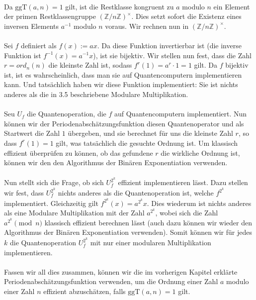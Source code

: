 \paragraph{}
Da $\text{ggT}(a, n) = 1$ gilt, ist die Restklasse kongruent zu $a$ modulo $n$ ein Element der primen Restklassengruppe $(\mathbb {Z}/n\mathbb {Z} )^{\times}$. Dies setzt sofort die Existenz eines inversen Elements $a^{-1}$ modulo $n$ voraus. Wir rechnen nun in $(\mathbb {Z}/n\mathbb {Z})^{\times}$.
\paragraph{}
Sei $f$ definiert als $f(x) := ax$. Da diese Funktion invertierbar ist (die inverse Funktion ist $f^{-1}(x) = a^{-1}x$), ist sie bijektiv. Wir stellen nun fest, dass die Zahl $r = ord_n(n)$ die kleinste Zahl ist, sodass $f^r(1) = a^r\cdot 1 = 1$ gilt. Da $f$ bijektiv ist, ist es wahrscheinlich, dass man sie auf Quantencomputern implementieren kann. Und tatsächlich haben wir diese Funktion implementiert: Sie ist nichts anderes als die in 3.5 beschriebene Modulare Multiplikation.

\paragraph{}
Seu $U_f$ die Quantenoperation, die $f$ auf Quantencomputern implementiert. Nun können wir der Periodenabschätzungsfunktion diesen Quantenoperator und als Startwert die Zahl $1$ übergeben, und sie berechnet für uns die kleinste Zahl $r$, so dass $f^r(1) = 1$ gilt, was tatsächlich die gesuchte Ordnung ist. Um klassisch effizient überprüfen zu können, ob das gefundene $r$ die wirkliche Ordnung ist, können wir den den Algorithmus der Binären Exponentiation verwenden.
\paragraph{}
Nun stellt sich die Frage, ob sich $U_f^{2^k}$ effizient implementieren lässt. Dazu stellen wir fest, dass $U_f^{2^k}$ nichts anderes als die Quantenoperation ist, welche $f^{2^k}$ implementiert. Gleichzeitig gilt $f^{2^k}(x) = a^{2^k}x$. Dies wiederum ist nichts anderes als eine Modulare Multiplikation mit der Zahl $a^{2^k}$, wobei sich die Zahl $a^{2^k} \pmod{n}$ klassisch effizient berechnen lässt (auch dazu können wir wieder den Algorithmus der Binären Exponentiation verwenden). Somit können wir für jedes $k$ die Quantenoperation $U_f^{2^k}$ mit nur einer modularen Multiplikation implementieren.
\paragraph{}
Fassen wir all dies zusammen, können wir die im vorherigen Kapitel erklärte Periodenabschätzungsfunktion verwenden, um die Ordnung einer Zahl $a$ modulo einer Zahl $n$ effizient abzuschätzen, falls $\text{ggT}(a, n) = 1$ gilt.

